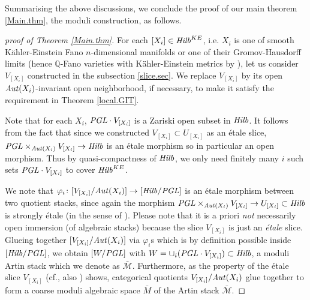 \documentclass[12pt]{amsart}
\theoremstyle{remark}
\theoremstyle{definition}
\begin{document}
Summarising the above discussions, we conclude the proof of 
our main theorem \ref{Main.thm}, the moduli construction, as follows. 

\begin{proof}[proof of Theorem \ref{Main.thm}]
For each $[X_{i}]\in {\it Hilb}^{KE}$, i.e. $X_{i}$ is 
one of smooth K\"ahler-Einstein Fano $n$-dimensional manifolds or 
one of their Gromov-Hausdorff limits (hence $\mathbb{Q}$-Fano varieties 
with K\"ahler-Einstein metrics by \cite{DS}), 
let us consider $V_{[X_{i}]}$ constructed in 
the subsection \ref{slice.sec}. We replace $V_{[X_{i}]}$ 
by its open ${\it Aut}(X_{i})$-invariant 
open neighborhood, if necessary, 
to make it satisfy the requirement in Theorem \ref{local.GIT}. 

Note that for each $X_{i}$, ${\it PGL}\cdot V_{[X_{i}]}$ is a Zariski open subset 
in ${\it Hilb}$. It follows from the fact that since we constructed 
$V_{[X_{i}]}\subset U_{[X_{i}]}$ as an \'etale 
slice, ${\it PGL}\times_{{\it Aut}(X_{i})}V_{[X_{i}]}\to {\it Hilb}$ 
is an \'etale morphism so in particular an open morphism. 
Thus by quasi-compactness of 
${\it Hilb}$, we only need finitely many $i$ such sets ${\it PGL}\cdot V_{[X_{i}]}$ to 
cover ${\it Hilb}^{KE}$. 

We note that $\varphi_{i}\colon [V_{[X_{i}]}/{\it Aut}(X_{i})]\rightarrow [{\it Hilb}/{\it PGL}]$ 
is an \'etale morphism between two quotient stacks, since again the morphism 
${\it PGL}\times _{{\it Aut}(X_{i})}V_{[X_{i}]}\to U_{[X_{i}]}\subset {\it Hilb}$ 
is strongly \'etale (in the sense of \cite[subsection 1.1]{Dre}). 
Please note that it is a priori \textit{not}  
necessarily open immersion (of algebraic stacks) because the slice 
$V_{[X_{i}]}$ is just an \textit{\'etale} slice. 
Glueing together $[V_{[X_{i}]}/{\it Aut}(X_{i})]$ via $\varphi_{i}$s 
which is by definition possible 
inside $[{\it Hilb}/{\it PGL}]$, 
we obtain $[W/{\it PGL}]$ with $W=\cup_{i} ({\it PGL}\cdot V_{[X_{i}]})\subset 
{\it Hilb}$, 
a moduli Artin stack which we denote as $\bar{\mathcal{M}}$. 
Furthermore, as the property \cite[subsection 1.1 (ii)]{Dre} 
of the \'etale slice $V_{[X_{i}]}$ (cf., also \cite[5.3]{Dre}) shows, 
categorical quotients $V_{[X_{i}]}/{\it Aut}(X_{i})$ glue together to form 
a coarse moduli algebraic space $\bar{M}$ of the Artin stack $\bar{\mathcal{M}}$. 


\end{proof}
\end{document}
